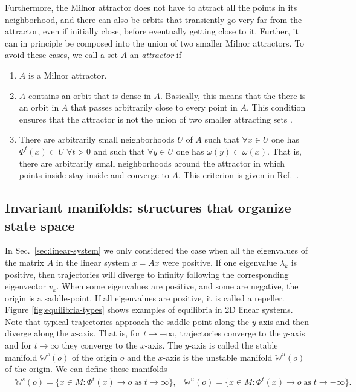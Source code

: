 Furthermore, the Milnor attractor does not have to attract all the points in its neighborhood, and there can also be orbits that transiently go very far from the attractor, even if initially close, before eventually getting close to it. Further, it can in principle be composed into the union of two smaller Milnor attractors. To avoid these cases, we call a set $A$ an \textit{attractor} if
%
\begin{enumerate}
    \item $A$ is a Milnor attractor.
    \item $A$ contains an orbit that is dense in $A$. Basically, this means that the there is an orbit in $A$ that passes arbitrarily close to every point in $A$. This condition ensures that the attractor is not the union of two smaller attracting sets \cite{taylor2011attractors}. %
    \item There are arbitrarily small neighborhoods $U$ of $A$ such that $\forall x \in U$ one has $\Phi^t(x) \subset U  \; \forall t>0$ and such that $\forall y \in U$ one has $\omega(y) \subset \omega(x)$. That is, there are arbitrarily small neighborhoods around the attractor in which points inside stay inside and converge to $A$. This criterion is given in Ref.~\cite{broer2011dynamical}.
\end{enumerate}

\subsection{Invariant manifolds: structures that organize state space}

In Sec.~\ref{sec:linear-system} we only considered the case when all the eigenvalues of the matrix $A$ in the linear system $\dot{x} = A x$ were positive. If one eigenvalue $\lambda_k$ is positive, then trajectories will diverge to infinity following the corresponding eigenvector $v_k$. When some eigenvalues are positive, and some are negative, the origin is a saddle-point. If all eigenvalues are positive, it is called a repeller.
Figure \ref{fig:equilibria-types} shows examples of equilibria in 2D linear systems. Note that typical trajectories approach the saddle-point along the $y$-axis and then diverge along the $x$-axis. That is, for $t \to -\infty$, trajectories converge to the $y$-axis and for $t \to \infty$ they converge to the $x$-axis. The $y$-axis is called the stable manifold $\mathbb{W}^s(o)$ of the origin $o$ and the $x$-axis is the unstable manifold $\mathbb{W}^u(o)$ of the origin. We can define these manifolds
\begin{align}
&\mathbb{W}^s(o) = \{x \in M: \Phi^t(x) \to o \;\mathrm{as}\; t\to\infty\}, 
&\mathbb{W}^u(o) = \{x \in M: \Phi^t(x) \to o \;\mathrm{as }\; t\to -\infty\}.
\end{align}

